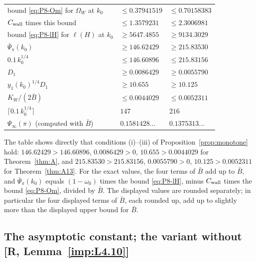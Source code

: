 \documentclass[11pt]{amsart}
\theoremstyle{definition}
\theoremstyle{remark}
\numberwithin{equation}{section}
\begin{document}
\begin{table}[ht]
\begin{tabular}{|l|l|l|}
\hline
bound \eqref{eq:P8-Om} for $\Omega_W$ at $k_0$ & $\le0.37941519$ & $\le0.70158383$\\
$C_{\rm wall}$ times this bound & $\le1.3579231$ & $\le2.3006981$\\
bound \eqref{eq:P8-lH} for $\ell(H)$ at $k_0$ & $\ge5647.4855$ & $\ge9134.3029$\\
$\bar\Psi_\pi(k_0)$ & $\ge146.62429$ & $\ge215.83530$\\
$0.1\,k_0^{1/4}$ & $\le146.60896$ & $\le215.83156$\\
$D_1$ & $\ge0.0086429$ & $\ge0.0055790$\\
$y_1(k_0)^{1/4}D_1$ & $\ge10.655$ & $\ge10.125$\\
$K_W/(2\bar B)$ & $\le0.0044029$ & $\le0.0052311$\\
$\lceil0.1\,k_0^{1/4}\rceil$ & $147$ & $216$\\
\hline
$\Psi_\infty(\pi)$ (computed with $\bar B$) & $0.1581428\ldots$ & $0.1375313\ldots$\\
\hline
\end{tabular}
\end{table}

The table shows directly that conditions (i)--(iii) of Proposition~\ref{prop:monotone} hold:
$146.62429>146.60896$, $0.0086429>0$, $10.655>0.0044029$ for Theorem~\ref{thm:A}, and
$215.83530>215.83156$, $0.0055790>0$, $10.125>0.0052311$ for Theorem~\ref{thm:A13}. For the exact values, the four
terms of $\bar B$ add up to $\bar B$, and $\bar\Psi_\pi(k_0)$ equals $(1-\omega_0)$ times the bound \eqref{eq:P8-lH},
minus $C_{\rm wall}$ times the bound \eqref{eq:P8-Om}, divided by $\bar B$. The displayed values are rounded
separately; in particular the four displayed terms of $\bar B$, each rounded up, add up to slightly more than the
displayed upper bound for $\bar B$.

\subsection{The asymptotic constant; the variant without \texorpdfstring{[R, Lemma~\ref{imp:L4.10}]}{[R, Lemma 4.10]}}\label{subsec:const-asym}
\end{document}
